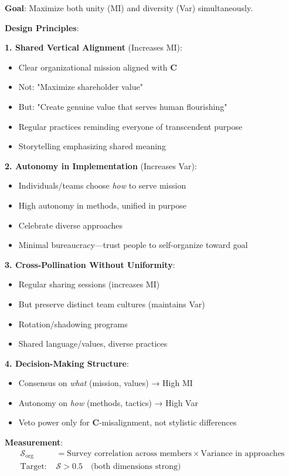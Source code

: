 \documentclass[11pt,a4paper]{article}
\theoremstyle{definition}
\theoremstyle{remark}
\begin{document}
\begin{small}
\begin{enumerate}
\begin{protocol}
\textbf{Goal}: Maximize both unity (MI) and diversity (Var) simultaneously.

\textbf{Design Principles}:

\textbf{1. Shared Vertical Alignment} (Increases MI):
\begin{itemize}
    \item Clear organizational mission aligned with \(\mathbf{C}\)
    \item Not: "Maximize shareholder value"
    \item But: "Create genuine value that serves human flourishing"
    \item Regular practices reminding everyone of transcendent purpose
    \item Storytelling emphasizing shared meaning
\end{itemize}

\textbf{2. Autonomy in Implementation} (Increases Var):
\begin{itemize}
    \item Individuals/teams choose \textit{how} to serve mission
    \item High autonomy in methods, unified in purpose
    \item Celebrate diverse approaches
    \item Minimal bureaucracy—trust people to self-organize toward goal
\end{itemize}

\textbf{3. Cross-Pollination Without Uniformity}:
\begin{itemize}
    \item Regular sharing sessions (increases MI)
    \item But preserve distinct team cultures (maintains Var)
    \item Rotation/shadowing programs
    \item Shared language/values, diverse practices
\end{itemize}

\textbf{4. Decision-Making Structure}:
\begin{itemize}
    \item Consensus on \textit{what} (mission, values) → High MI
    \item Autonomy on \textit{how} (methods, tactics) → High Var
    \item Veto power only for \(\mathbf{C}\)-misalignment, not stylistic differences
\end{itemize}

\textbf{Measurement}:
\begin{align}
\mathcal{S}_{\text{org}} &= \text{Survey correlation across members} \times \text{Variance in approaches} \\
\text{Target: } &\mathcal{S} > 0.5 \quad \text{(both dimensions strong)}
\end{align}
\end{protocol}


\end{enumerate}
\end{small}
\end{document}
